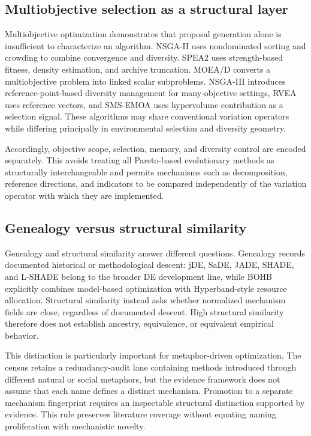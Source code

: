 \subsection{Multiobjective selection as a structural layer}

Multiobjective optimization demonstrates that proposal generation alone is insufficient to characterize an algorithm. NSGA-II \cite{deb2002nsga2} uses nondominated sorting and crowding to combine convergence and diversity. SPEA2 uses strength-based fitness, density estimation, and archive truncation. MOEA/D \cite{zhang2007moead} converts a multiobjective problem into linked scalar subproblems. NSGA-III \cite{deb2014nsga3} introduces reference-point-based diversity management for many-objective settings, RVEA uses reference vectors, and SMS-EMOA uses hypervolume contribution as a selection signal. These algorithms may share conventional variation operators while differing principally in environmental selection and diversity geometry.

Accordingly, objective scope, selection, memory, and diversity control are encoded separately. This avoids treating all Pareto-based evolutionary methods as structurally interchangeable and permits mechanisms such as decomposition, reference directions, and indicators to be compared independently of the variation operator with which they are implemented.

\subsection{Genealogy versus structural similarity}

Genealogy and structural similarity answer different questions. Genealogy records documented historical or methodological descent: jDE, SaDE, JADE, SHADE, and L-SHADE belong to the broader DE development line, while BOHB explicitly combines model-based optimization with Hyperband-style resource allocation. Structural similarity instead asks whether normalized mechanism fields are close, regardless of documented descent. High structural similarity therefore does not establish ancestry, equivalence, or equivalent empirical behavior.

This distinction is particularly important for metaphor-driven optimization. The census retains a redundancy-audit lane containing methods introduced through different natural or social metaphors, but the evidence framework does not assume that each name defines a distinct mechanism. Promotion to a separate mechanism fingerprint requires an inspectable structural distinction supported by evidence. This rule preserves literature coverage without equating naming proliferation with mechanistic novelty.


